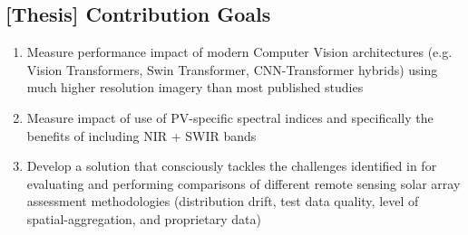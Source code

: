 \subsection{[Thesis] Contribution Goals}
    \begin{enumerate}
        \item Measure performance impact of modern Computer Vision architectures (e.g. Vision Transformers, Swin Transformer, CNN-Transformer hybrids) using much higher resolution imagery than most published studies 
        \item Measure impact of use of PV-specific spectral indices and specifically the benefits of including NIR + SWIR bands
        \item Develop a solution that consciously tackles the challenges identified in \cite{Hu_solar_array_pitfalls_2022} for evaluating and performing comparisons of different remote sensing solar array assessment methodologies (distribution drift, test data quality, level of spatial-aggregation, and proprietary data)
    \end{enumerate}
    \hfill
